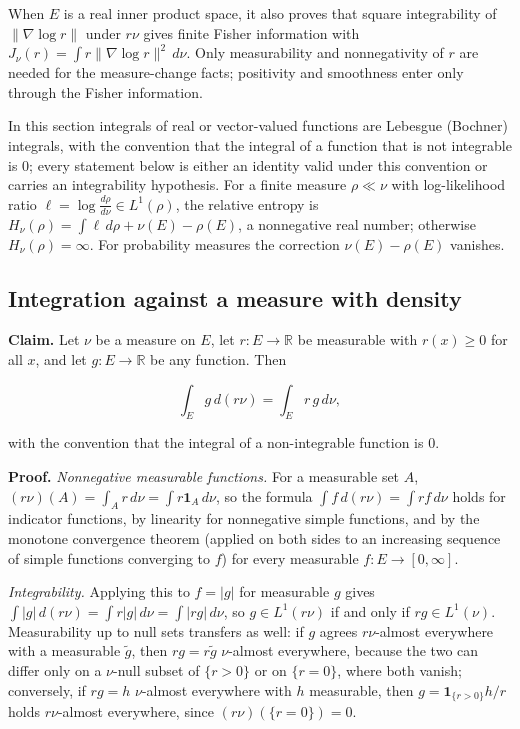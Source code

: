 \documentclass[11pt,a4paper]{report}
\begin{document}
When \(E\) is a real inner product space, it also proves that square integrability of \(\|\nabla\log r\|\) under \(r\nu\) gives finite Fisher information with \(J_\nu(r)=\int r\|\nabla\log r\|^2\,d\nu\). Only measurability and nonnegativity of \(r\) are needed for the measure-change facts; positivity and smoothness enter only through the Fisher information.




In this section integrals of real or vector-valued functions are Lebesgue (Bochner) integrals, with the convention that the integral of a function that is not integrable is \(0\); every statement below is either an identity valid under this convention or carries an integrability hypothesis. For a finite measure \(\rho\ll\nu\) with log-likelihood ratio \(\ell=\log\frac{d\rho}{d\nu}\in L^1(\rho)\), the relative entropy is \(H_\nu(\rho)=\int\ell\,d\rho+\nu(E)-\rho(E)\), a nonnegative real number; otherwise \(H_\nu(\rho)=\infty\). For probability measures the correction \(\nu(E)-\rho(E)\) vanishes.

\subsection{\texorpdfstring{Integration against a measure with density}{Integration against a measure with density}}
\label{report-step-UnadjustedLangevin-LSI-KLOfDensity-lean-1}


\textbf{Claim.} Let \(\nu\) be a measure on \(E\), let \(r:E\to\mathbb R\) be measurable with \(r(x)\ge0\) for all \(x\), and let \(g:E\to\mathbb R\) be any function. Then


\[\int_Eg\,d(r\nu)=\int_Er\,g\,d\nu,\]


with the convention that the integral of a non-integrable function is \(0\).




\textbf{Proof.} \emph{Nonnegative measurable functions.} For a measurable set \(A\), \((r\nu)(A)=\int_Ar\,d\nu=\int r\mathbf 1_A\,d\nu\), so the formula \(\int f\,d(r\nu)=\int rf\,d\nu\) holds for indicator functions, by linearity for nonnegative simple functions, and by the monotone convergence theorem (applied on both sides to an increasing sequence of simple functions converging to \(f\)) for every measurable \(f:E\to[0,\infty]\).




\emph{Integrability.} Applying this to \(f=|g|\) for measurable \(g\) gives \(\int|g|\,d(r\nu)=\int r|g|\,d\nu=\int|rg|\,d\nu\), so \(g\in L^1(r\nu)\) if and only if \(rg\in L^1(\nu)\). Measurability up to null sets transfers as well: if \(g\) agrees \(r\nu\)-almost everywhere with a measurable \(\tilde g\), then \(rg=r\tilde g\) \(\nu\)-almost everywhere, because the two can differ only on a \(\nu\)-null subset of \(\{r>0\}\) or on \(\{r=0\}\), where both vanish; conversely, if \(rg=h\) \(\nu\)-almost everywhere with \(h\) measurable, then \(g=\mathbf 1_{\{r>0\}}h/r\) holds \(r\nu\)-almost everywhere, since \((r\nu)(\{r=0\})=0\).
\end{document}
